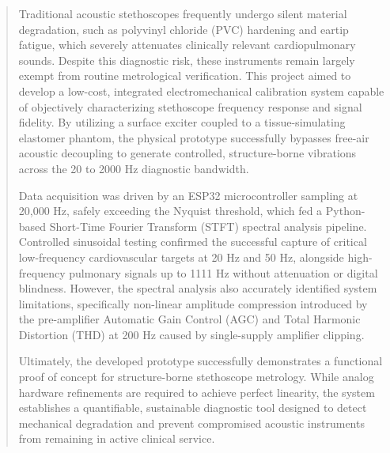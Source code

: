 

\begin{abstract}
Traditional acoustic stethoscopes frequently undergo silent material degradation, such as polyvinyl chloride (PVC) hardening and eartip fatigue, which severely attenuates clinically relevant cardiopulmonary sounds. Despite this diagnostic risk, these instruments remain largely exempt from routine metrological verification. This project aimed to develop a low-cost, integrated electromechanical calibration system capable of objectively characterizing stethoscope frequency response and signal fidelity. By utilizing a surface exciter coupled to a tissue-simulating elastomer phantom, the physical prototype successfully bypasses free-air acoustic decoupling to generate controlled, structure-borne vibrations across the 20 to 2000 Hz diagnostic bandwidth. 

Data acquisition was driven by an ESP32 microcontroller sampling at 20,000 Hz, safely exceeding the Nyquist threshold, which fed a Python-based Short-Time Fourier Transform (STFT) spectral analysis pipeline. Controlled sinusoidal testing confirmed the successful capture of critical low-frequency cardiovascular targets at 20 Hz and 50 Hz, alongside high-frequency pulmonary signals up to 1111 Hz without attenuation or digital blindness. However, the spectral analysis also accurately identified system limitations, specifically non-linear amplitude compression introduced by the pre-amplifier Automatic Gain Control (AGC) and Total Harmonic Distortion (THD) at 200 Hz caused by single-supply amplifier clipping. 

Ultimately, the developed prototype successfully demonstrates a functional proof of concept for structure-borne stethoscope metrology. While analog hardware refinements are required to achieve perfect linearity, the system establishes a quantifiable, sustainable diagnostic tool designed to detect mechanical degradation and prevent compromised acoustic instruments from remaining in active clinical service.




\end{abstract}
